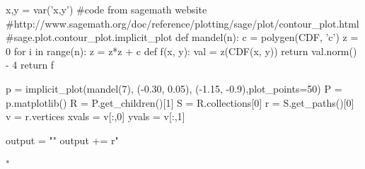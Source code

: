 \documentclass{article}
\begin{document}
\begin{sagesilent}
x,y = var('x,y')
#code from sagemath website
#http://www.sagemath.org/doc/reference/plotting/sage/plot/contour_plot.html#sage.plot.contour_plot.implicit_plot
def mandel(n):
      c = polygen(CDF, 'c')
      z = 0
      for i in range(n):
          z = z*z + c
      def f(x, y):
          val = z(CDF(x, y))
          return val.norm() - 4
      return f
        
p = implicit_plot(mandel(7), (-0.30, 0.05), (-1.15, -0.9),plot_points=50)
P = p.matplotlib()
R = P.get_children()[1]
S = R.collections[0]
r = S.get_paths()[0]
v = r.vertices
xvals = v[:,0]
yvals = v[:,1]

output = ""
output += r""
\end{sagesilent}
\end{document}
